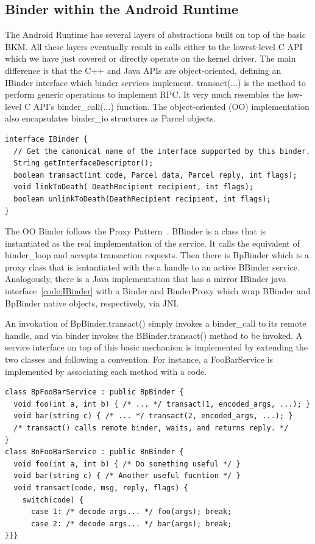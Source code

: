 \documentclass[prodmode]{acmlarge}
\begin{document}
\subsection{Binder within the Android Runtime}
The Android Runtime has several layers of abstractions built on top of the basic BKM. All these layers eventually result in calls either to the lowest-level C API which we have just covered or directly operate on the kernel driver. The main difference is that the C++ and Java APIs are object-oriented, defining an IBinder interface which binder services implement. transact(...) is the method to perform generic operations to implement RPC. It very much resembles the low-level C API's binder\_call(...) function. The object-oriented (OO) implementation also encapsulates binder\_io structures as Parcel objects.

\begin{Verbatim}[samepage=true]
interface IBinder {
  // Get the canonical name of the interface supported by this binder.
  String getInterfaceDescriptor();
  boolean transact(int code, Parcel data, Parcel reply, int flags);
  void linkToDeath( DeathRecipient recipient, int flags);
  boolean unlinkToDeath(DeathRecipient recipient, int flags);
}
\end{Verbatim}

The OO Binder follows the Proxy Pattern~\cite{ProxyPattern}. BBinder is a class that is instantiated as the real implementation of the service. It calls the equivalent of binder\_loop and accepts transaction requests. Then there is BpBinder which is a proxy class that is isntantiated with the a handle to an active BBinder service. Analogously, there is a Java implementation that has a mirror IBinder java interface~\ref{code:IBinder} with a Binder and BinderProxy which wrap BBinder and BpBinder native objects, respectively, via JNI.

An invokation of BpBinder.transact() simply invokes a binder\_call to its remote handle, and via binder invokes the BBinder.transact() method to be invoked. A service interface on top of this basic mechanism is implemented by extending the two classes and following a convention. For instance, a FooBarService is implemented by associating each method with a code.

\begin{Verbatim}[samepage=true]
class BpFooBarService : public BpBinder {
  void foo(int a, int b) { /* ... */ transact(1, encoded_args, ...); }
  void bar(string c) { /* ... */ transact(2, encoded_args, ...); }
  /* transact() calls remote binder, waits, and returns reply. */
}
class BnFooBarService : public BnBinder {
  void foo(int a, int b) { /* Do something useful */ }
  void bar(string c) { /* Another useful fucntion */ }
  void transact(code, msg, reply, flags) {
    switch(code) {
      case 1: /* decode args... */ foo(args); break;
      case 2: /* decode args... */ bar(args); break;
}}}
\end{Verbatim}
\end{document}
